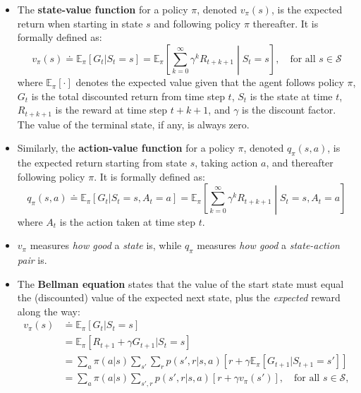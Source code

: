 \begin{itemize}
    \item The \textbf{state-value function} for a policy $\pi$, denoted $v_{\pi}(s)$, is the expected return when starting in state $s$ and following policy $\pi$ thereafter. It is formally defined as:
    \begin{equation}
    v_{\pi}(s) \doteq \mathbb{E}_{\pi}[G_t | S_t=s] = \mathbb{E}_{\pi}\left[\sum_{k=0}^{\infty} \gamma^k R_{t+k+1} \middle| S_t=s\right], \quad \text{for all } s \in \mathcal{S}
    \end{equation}
    where $\mathbb{E}_{\pi}[\cdot]$ denotes the expected value given that the agent follows policy $\pi$, $G_t$ is the total discounted return from time step $t$, $S_t$ is the state at time $t$, $R_{t+k+1}$ is the reward at time step $t+k+1$, and $\gamma$ is the discount factor. The value of the terminal state, if any, is always zero.

    \item Similarly, the \textbf{action-value function} for a policy $\pi$, denoted $q_{\pi}(s, a)$, is the expected return starting from state $s$, taking action $a$, and thereafter following policy $\pi$. It is formally defined as:
    \begin{equation}
        q_{\pi}(s, a) \doteq \mathbb{E}_{\pi}[G_t | S_t=s, A_t=a] = \mathbb{E}_{\pi}\left[\sum_{k=0}^{\infty} \gamma^k R_{t+k+1} \middle| S_t=s, A_t=a\right]
    \end{equation}
    where $A_t$ is the action taken at time step $t$.

    \item  $v_{\pi}$ measures \textit{how good} a \textit{state} is, while $q_{\pi}$ measures \textit{how good} a \textit{state-action pair} is.

    \item The \textbf{Bellman equation}  states that the value of the start state must equal the (discounted) value of the expected next state, plus the \textit{expected} reward along the way:
    \begin{align} %
        v_{\pi}(s) & \doteq \mathbb{E}_{\pi}[G_t | S_t=s] \nonumber \\ %
        & = \mathbb{E}_{\pi}[R_{t+1} + \gamma G_{t+1} | S_t=s] \nonumber \\ %
        & = \sum_a \pi(a|s) \sum_{s'} \sum_r p(s', r | s, a) \left[r + \gamma \mathbb{E}_{\pi}[G_{t+1} | S_{t+1}=s']\right] \nonumber \\ %
        & = \sum_a \pi(a|s) \sum_{s',r} p(s', r | s, a) \left[r + \gamma v_{\pi}(s')\right], \quad \text{for all } s \in \mathcal{S}, \label{eq:bellman_value} %
    \end{align}
    

\end{itemize}
